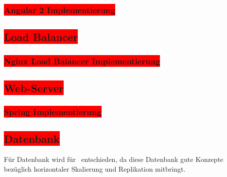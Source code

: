 \subsubsection{\colorbox{red}{Angular 2 Implementierung}}

\subsection{\colorbox{red}{Load Balancer}}

\subsubsection{\colorbox{red}{Nginx Load Balancer Implementierung}}

\subsection{\colorbox{red}{Web-Server}}

\subsubsection{\colorbox{red}{Spring Implementierung}}

\subsection{\colorbox{red}{Datenbank}}

Für Datenbank wird für \mongo\ entschieden, da diese Datenbank gute Konzepte bezüglich horizontaler Skalierung und Replikation mitbringt.

